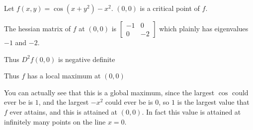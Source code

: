 \documentclass{ximera}
\begin{document}
	\begin{question}
		Let $f(x,y) = \cos(x+y^2)-x^2$.  $(0,0)$ is a critical point of $f$.
			\begin{solution}
				\begin{hint}
					The hessian matrix of $f$ at $(0,0)$ is \( \begin{bmatrix} -1 & 0\\0&-2\end{bmatrix}\) which plainly has eigenvalues $-1$ and $-2$.
				\end{hint}
				\begin{hint}
					Thus $D^2f(0,0)$ is negative definite
				\end{hint}
				\begin{hint}
					Thus $f$ has a local maximum at $(0,0)$
				\end{hint}
				\begin{hint}
					You can actually see that this is a global maximum, since the largest $\cos$ could ever be is $1$, and the largest $-x^2$ could ever be is $0$,
					so $1$ is the largest value that $f$ ever attains, and this is attained at $(0,0)$.  In fact this value is attained at infinitely many points on the line $x=0$.
				\end{hint}
				\begin{multiple-choice}
			\end{multiple-choice}
			\end{solution}
	\end{question}
	
	
	
	
	
\end{document}
